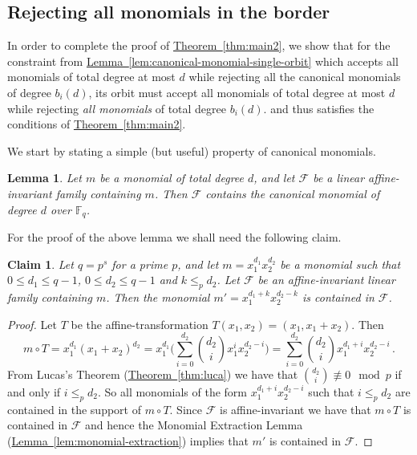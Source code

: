 \documentclass[10pt]{article}
\newtheorem{lemma}[theorem]{Lemma}
\newtheorem{claim}[theorem]{Claim}
\theoremstyle{definition}
\numberwithin{equation}{section}
\newcommand{\expref}[2]{\texorpdfstring{\hyperref[#2]{#1~\ref{#2}}}{#1~\ref{#2}}}
\newcommand{\F}{{\mathbb{F}}}
\newcommand{\cF}{{\mathcal{F}}}
\begin{document}
\subsection{Rejecting all monomials in the border}
\label{ssec:complete}

In order to complete the proof of \expref{Theorem}{thm:main2}, we show that for the constraint from \expref{Lemma}{lem:canonical-monomial-single-orbit}
which accepts all monomials of total degree at most $d$ while rejecting
all the canonical monomials of degree $b_i(d)$,  its orbit must accept all monomials of total degree at most $d$ while rejecting \emph{all monomials} of total degree $b_i(d)$.
%
and thus satisfies the conditions of \expref{Theorem}{thm:main2}.

We start by stating a simple (but useful) property of canonical monomials.

\begin{lemma}\label{lem:canonical-monomial}
Let $m$ be a monomial of total degree $d$, and let $\cF$ be a linear affine-invariant family containing $m$. Then $\cF$ contains the canonical monomial of degree $d$ over $\F_q$.
\end{lemma}


For the proof of the above lemma we shall need the following claim.

\begin{claim}\label{lem:canonical-monomial-bivariate}
Let $q = p^s$ for a prime $p$, and
let $m = x_1^{d_1} x_2^{d_2}$ be a monomial such that $0 \leq d_1 \leq q-1$, $0 \leq d_2 \leq q-1$ and $k \leq_p d_2$. Let $\cF$ be an affine-invariant linear family containing $m$.
 Then
the monomial $m' = x_1^{d_1+ k} x_2^{d_2 - k}$ is contained in $\cF$.
\end{claim}

\begin{proof}
Let $T$ be the affine-transformation $T(x_1, x_2) = (x_1, x_1+x_2)$.
Then
\[m \circ T = x_1^{d_1} (x_1+x_2)^{d_2} = x_1^{d_1} \bigg( \sum_{i=0}^{d_2} \binom {d_2} { i} x_1^i x_2^{d_2 - i} \bigg) =
\sum_{i=0}^{d_2} \binom {d_2} {i} x_1^{d_1+i} x_2^{d_2 - i} \,.\]
{}From Lucas's Theorem (\expref{Theorem}{thm:luca}) we have that $\binom {d_2} {i} \not \equiv 0 \mod p$ if and only if $i \leq_p d_2$.
So all monomials of the form $x_1^{d_1+i} x_2^{d_2 - i}$ such that $i \leq_p d_2$ are contained in the support of
$m \circ T$. 
%
Since $\cF$ is affine-invariant we have that $m \circ T$ is contained in $\cF$ and hence the
%
Monomial Extraction Lemma %
(\expref{Lemma}{lem:monomial-extraction}) implies that $m'$ is contained in $\cF$.
\end{proof}
\end{document}
